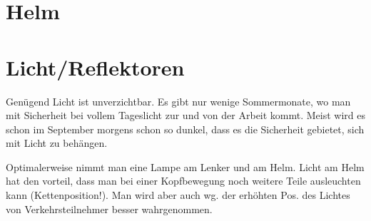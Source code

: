 \section{Helm}

\section{Licht/Reflektoren}

Genügend Licht ist unverzichtbar. Es gibt nur wenige Sommermonate, wo man mit Sicherheit bei vollem Tageslicht zur und von der Arbeit kommt.
Meist wird es schon im September morgens schon so dunkel, dass es die Sicherheit gebietet, sich mit Licht zu behängen.

Optimalerweise nimmt man eine Lampe am Lenker und am Helm. Licht am Helm hat den vorteil, dass man bei einer Kopfbewegung
noch weitere Teile ausleuchten kann (Kettenposition!). Man wird aber auch wg. der erhöhten Pos. des Lichtes
von Verkehrsteilnehmer besser wahrgenommen.

